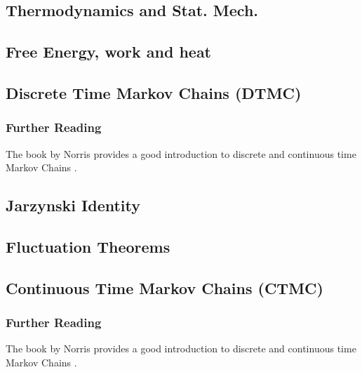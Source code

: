 \documentclass[Lectures.tex]{subfiles}
\begin{document}
\subsection{Thermodynamics and Stat. Mech.}

\subsection{Free Energy, work and heat}

\subsection{Discrete Time Markov Chains (DTMC)}


\subsubsection*{Further Reading}
The book by Norris provides a good introduction to discrete and continuous time Markov Chains .


\subsection{Jarzynski Identity}


\subsection{Fluctuation Theorems }


\subsection{Continuous Time Markov Chains (CTMC)}


\subsubsection*{Further Reading}
The book by Norris provides a good introduction to discrete and continuous time Markov Chains .
\end{document}
